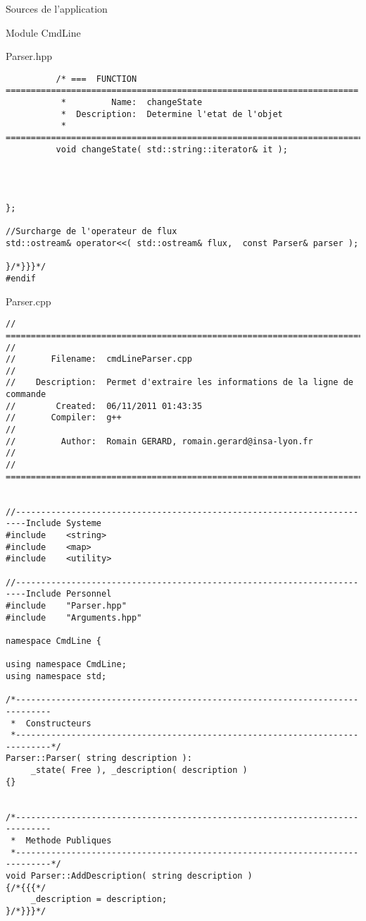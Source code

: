 \documentclass{article}
\begin{document}
\begin{section}{Sources de l'application}
\begin{subsection}{Module CmdLine}
\begin{paragraph}{Parser.hpp}
\begin{verbatim}
          /* ===  FUNCTION  ======================================================================
           *         Name:  changeState
           *  Description:  Determine l'etat de l'objet
           * =====================================================================================*/
          void changeState( std::string::iterator& it );




};

//Surcharge de l'operateur de flux
std::ostream& operator<<( std::ostream& flux,  const Parser& parser );

}/*}}}*/
#endif
      \end{verbatim}
      \end{paragraph}
   

  \newpage
  \begin{paragraph}{Parser.cpp}
      \begin{verbatim}
// =====================================================================================
//
//       Filename:  cmdLineParser.cpp
//
//    Description:  Permet d'extraire les informations de la ligne de commande
//        Created:  06/11/2011 01:43:35
//       Compiler:  g++
//
//         Author:  Romain GERARD, romain.gerard@insa-lyon.fr
//
// =====================================================================================


//------------------------------------------------------------------------Include Systeme
#include    <string>
#include    <map>
#include    <utility>

//------------------------------------------------------------------------Include Personnel
#include    "Parser.hpp"
#include    "Arguments.hpp"

namespace CmdLine {

using namespace CmdLine;
using namespace std;

/*-----------------------------------------------------------------------------
 *  Constructeurs
 *-----------------------------------------------------------------------------*/
Parser::Parser( string description ):
     _state( Free ), _description( description )
{}


/*-----------------------------------------------------------------------------
 *  Methode Publiques
 *-----------------------------------------------------------------------------*/
void Parser::AddDescription( string description )
{/*{{{*/
     _description = description;
}/*}}}*/


\end{verbatim}
\end{paragraph}
\end{subsection}
\end{section}
\end{document}
